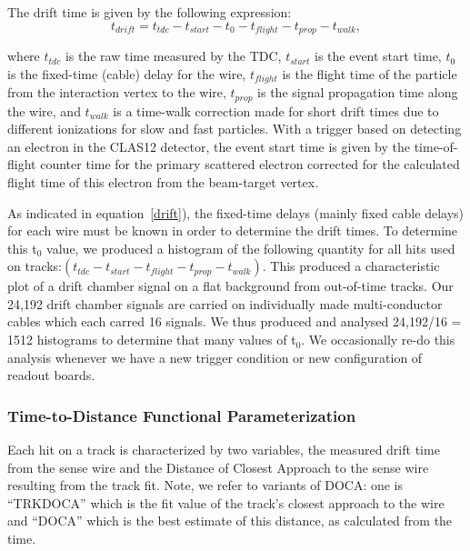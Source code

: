 The drift time is given by the following expression:
\begin{equation} 
\label{drift}
t_{drift} = t_{tdc} - t_{start} - t_{0} - t_{flight} - t_{prop} - t_{walk},
\end{equation}

\noindent
where $t_{tdc}$ is the raw time measured by the TDC, $t_{start}$ is the event start time, 
$t_0$ is the fixed-time (cable) delay for the wire, $t_{flight}$ is the 
flight time of the particle from the interaction vertex to the wire, $t_{prop}$ 
is the signal propagation time along the wire, and $t_{walk}$ is a time-walk 
correction made for short drift times due to different ionizations for slow 
and fast particles.  
With a trigger based on detecting an electron in the CLAS12 detector, the event start time is 
given by the time-of-flight counter time for the primary scattered electron 
corrected for the calculated flight time of this electron from the beam-target vertex.

As indicated in equation~\ref{drift}), the fixed-time delays (mainly fixed cable delays) 
for each wire must be known in order to determine the drift times.   To determine
this t$_0$ value, we produced a histogram of the following quantity for all hits
used on tracks:$ ( t_{tdc} - t_{start} - t_{flight} - t_{prop} - t_{walk} )$.
This produced a characteristic plot of a drift chamber signal on a flat
background from out-of-time tracks.  Our 24,192 drift chamber signals are carried
on individually made multi-conductor cables which each carred 16 signals.  We thus
produced and analysed 24,192/16 = 1512 histograms to determine that many values of
t$_0$. We occasionally re-do this analysis whenever we have a new trigger condition
or new configuration of readout boards.


\subsubsection{Time-to-Distance Functional Parameterization}
\label{tdistcal}

\hskip 0.15in
Each hit on a track is characterized by two variables, the measured drift 
time from the sense wire and the Distance of Closest Approach to the 
sense wire resulting from the track fit. 
Note, we refer to variants of DOCA: one is ``TRKDOCA'' which is the
fit value of the track's closest approach to the wire and ``DOCA''
which is the best estimate of this distance, as calculated from the time.
 
